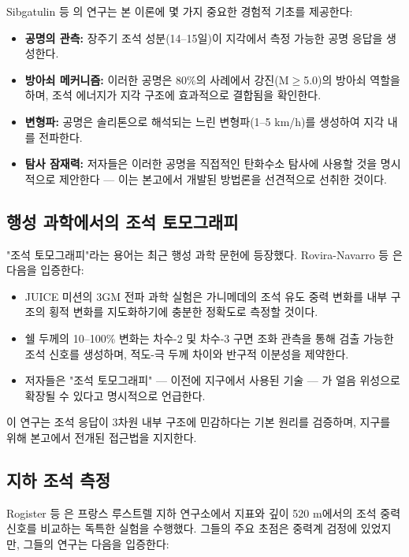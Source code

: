 \documentclass[12pt,a4paper]{article}
\theoremstyle{remark}
\begin{document}
	Sibgatulin 등 \cite{Sibgatulin2014}의 연구는 본 이론에 몇 가지 중요한 경험적 기초를 제공한다:
	
	\begin{itemize}
		\item \textbf{공명의 관측:} 장주기 조석 성분(14–15일)이 지각에서 측정 가능한 공명 응답을 생성한다.
		\item \textbf{방아쇠 메커니즘:} 이러한 공명은 80\%의 사례에서 강진(M$\ge$5.0)의 방아쇠 역할을 하며, 조석 에너지가 지각 구조에 효과적으로 결합됨을 확인한다.
		\item \textbf{변형파:} 공명은 솔리톤으로 해석되는 느린 변형파(1–5 km/h)를 생성하여 지각 내를 전파한다.
		\item \textbf{탐사 잠재력:} 저자들은 이러한 공명을 직접적인 탄화수소 탐사에 사용할 것을 명시적으로 제안한다 — 이는 본고에서 개발된 방법론을 선견적으로 선취한 것이다.
	\end{itemize}
	
	\subsection{행성 과학에서의 조석 토모그래피}
	
	"조석 토모그래피"라는 용어는 최근 행성 과학 문헌에 등장했다. Rovira-Navarro 등 \cite{RoviraNavarro2025}은 다음을 입증한다:
	
	\begin{itemize}
		\item JUICE 미션의 3GM 전파 과학 실험은 가니메데의 조석 유도 중력 변화를 내부 구조의 횡적 변화를 지도화하기에 충분한 정확도로 측정할 것이다.
		\item 쉘 두께의 10–100\% 변화는 차수-2 및 차수-3 구면 조화 관측을 통해 검출 가능한 조석 신호를 생성하며, 적도-극 두께 차이와 반구적 이분성을 제약한다.
		\item 저자들은 "조석 토모그래피" — 이전에 지구에서 사용된 기술 — 가 얼음 위성으로 확장될 수 있다고 명시적으로 언급한다.
	\end{itemize}
	
	이 연구는 조석 응답이 3차원 내부 구조에 민감하다는 기본 원리를 검증하며, 지구를 위해 본고에서 전개된 접근법을 지지한다.
	
	\subsection{지하 조석 측정}
	
	Rogister 등 \cite{Rogister2024}은 프랑스 루스트렐 지하 연구소에서 지표와 깊이 520 m에서의 조석 중력 신호를 비교하는 독특한 실험을 수행했다. 그들의 주요 초점은 중력계 검정에 있었지만, 그들의 연구는 다음을 입증한다:
	
\end{document}
